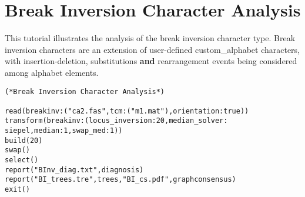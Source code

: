 
\section{Break Inversion Character Analysis}{\label{tutorial 13}}

This tutorial illustrates the analysis of the break inversion character type.  
Break inversion characters are an extension of user-defined \poyargument 
{custom\_alphabet} characters, with insertion-deletion, substitutions {\bf and} 
rearrangement events being considered among alphabet elements.

\begin{verbatim}
(*Break Inversion Character Analysis*)

read(breakinv:("ca2.fas",tcm:("m1.mat"),orientation:true))
transform(breakinv:(locus_inversion:20,median_solver:
siepel,median:1,swap_med:1))
build(20)
swap()
select()
report("BInv_diag.txt",diagnosis)
report("BI_trees.tre",trees,"BI_cs.pdf",graphconsensus)
exit()
\end{verbatim}

